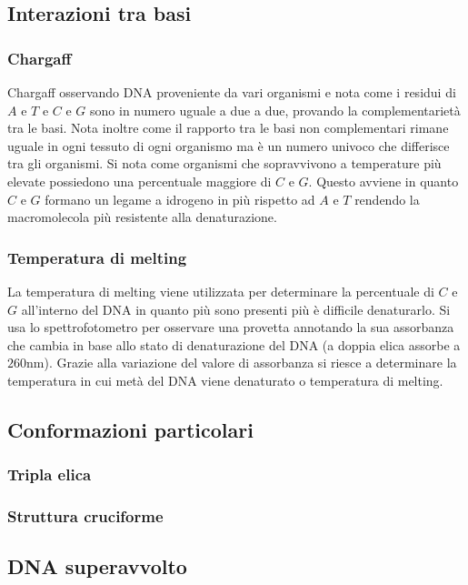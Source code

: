 \subsection{Interazioni tra basi}
\subsubsection{Chargaff}
Chargaff osservando DNA proveniente da vari organismi e nota come i residui di $A$ e $T$ e $C$ e $G$ sono in numero uguale a due a due, provando la complementariet\`a tra le basi. Nota
inoltre come il rapporto tra le basi non complementari rimane uguale in ogni tessuto di ogni organismo ma \`e un numero univoco che differisce tra gli organismi. Si nota come organismi
che sopravvivono a temperature pi\`u elevate possiedono una percentuale maggiore di $C$ e $G$. Questo avviene in quanto $C$ e $G$ formano un legame a idrogeno in pi\`u rispetto ad 
$A$ e $T$ rendendo la macromolecola pi\`u resistente alla denaturazione. 
\subsubsection{Temperatura di melting}
La temperatura di melting viene utilizzata per determinare la percentuale di $C$ e $G$ all'interno del DNA in quanto pi\`u sono presenti pi\`u \`e difficile denaturarlo. Si usa lo 
spettrofotometro per osservare una provetta annotando la sua assorbanza che cambia in base allo stato di denaturazione del DNA (a doppia elica assorbe a $260\si{\nano\metre}$). Grazie
alla variazione del valore di assorbanza si riesce a determinare la temperatura in cui met\`a del DNA viene denaturato o temperatura di melting. 
\subsection{Conformazioni particolari}
\subsubsection{Tripla elica}

\subsubsection{Struttura cruciforme}

\subsection{DNA superavvolto}

